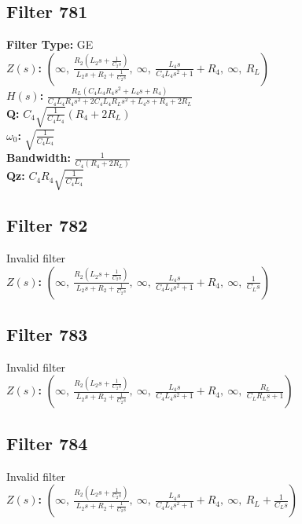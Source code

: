 \documentclass{article}
\begin{document}
\subsection*{Filter 781}
\textbf{Filter Type:} GE \\ 
\textbf{$Z(s)$:} $\left( \infty, \  \frac{R_{2} \left(L_{2} s + \frac{1}{C_{2} s}\right)}{L_{2} s + R_{2} + \frac{1}{C_{2} s}}, \  \infty, \  \frac{L_{4} s}{C_{4} L_{4} s^{2} + 1} + R_{4}, \  \infty, \  R_{L}\right)$ \\ 
\textbf{$H(s)$:} $\frac{R_{L} \left(C_{4} L_{4} R_{4} s^{2} + L_{4} s + R_{4}\right)}{C_{4} L_{4} R_{4} s^{2} + 2 C_{4} L_{4} R_{L} s^{2} + L_{4} s + R_{4} + 2 R_{L}}$ \\ 
\textbf{Q:} $C_{4} \sqrt{\frac{1}{C_{4} L_{4}}} \left(R_{4} + 2 R_{L}\right)$ \\ 
\textbf{$\omega_0$:} $\sqrt{\frac{1}{C_{4} L_{4}}}$ \\ 
\textbf{Bandwidth:} $\frac{1}{C_{4} \left(R_{4} + 2 R_{L}\right)}$ \\ 
\textbf{Qz:} $C_{4} R_{4} \sqrt{\frac{1}{C_{4} L_{4}}}$ \\ 
\subsection*{Filter 782}
Invalid filter \\ 
\textbf{$Z(s)$:} $\left( \infty, \  \frac{R_{2} \left(L_{2} s + \frac{1}{C_{2} s}\right)}{L_{2} s + R_{2} + \frac{1}{C_{2} s}}, \  \infty, \  \frac{L_{4} s}{C_{4} L_{4} s^{2} + 1} + R_{4}, \  \infty, \  \frac{1}{C_{L} s}\right)$ \\ 
\subsection*{Filter 783}
Invalid filter \\ 
\textbf{$Z(s)$:} $\left( \infty, \  \frac{R_{2} \left(L_{2} s + \frac{1}{C_{2} s}\right)}{L_{2} s + R_{2} + \frac{1}{C_{2} s}}, \  \infty, \  \frac{L_{4} s}{C_{4} L_{4} s^{2} + 1} + R_{4}, \  \infty, \  \frac{R_{L}}{C_{L} R_{L} s + 1}\right)$ \\ 
\subsection*{Filter 784}
Invalid filter \\ 
\textbf{$Z(s)$:} $\left( \infty, \  \frac{R_{2} \left(L_{2} s + \frac{1}{C_{2} s}\right)}{L_{2} s + R_{2} + \frac{1}{C_{2} s}}, \  \infty, \  \frac{L_{4} s}{C_{4} L_{4} s^{2} + 1} + R_{4}, \  \infty, \  R_{L} + \frac{1}{C_{L} s}\right)$ \\ 
\end{document}
